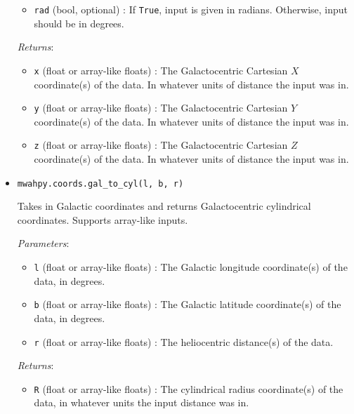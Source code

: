 \documentclass{article}
\begin{document}
\begin{itemize}
\begin{itemize}
\item \verb!rad! (bool, optional) : If \verb!True!, input is given in radians. Otherwise, input should be in degrees.

\end{itemize}

\textit{Returns}: \begin{itemize}

\item \verb!x! (float or array-like floats) : The Galactocentric Cartesian $X$ coordinate(s) of the data. In whatever units of distance the input was in.

\item \verb!y! (float or array-like floats) : The Galactocentric Cartesian $Y$ coordinate(s) of the data. In whatever units of distance the input was in.

\item \verb!z! (float or array-like floats) : The Galactocentric Cartesian $Z$ coordinate(s) of the data. In whatever units of distance the input was in.

\end{itemize}



\item \verb!mwahpy.coords.gal_to_cyl(l, b, r)!

Takes in Galactic coordinates and returns Galactocentric cylindrical coordinates. Supports array-like inputs.

\textit{Parameters}: \begin{itemize}

\item \verb!l! (float or array-like floats) : The Galactic longitude coordinate(s) of the data, in degrees.

\item \verb!b! (float or array-like floats) : The Galactic latitude coordinate(s) of the data, in degrees.

\item \verb!r! (float or array-like floats) : The heliocentric distance(s) of the data.

\end{itemize}

\textit{Returns}: \begin{itemize}

\item \verb!R! (float or array-like floats) : The cylindrical radius coordinate(s) of the data, in whatever units the input distance was in.


\end{itemize}
\end{itemize}
\end{document}
